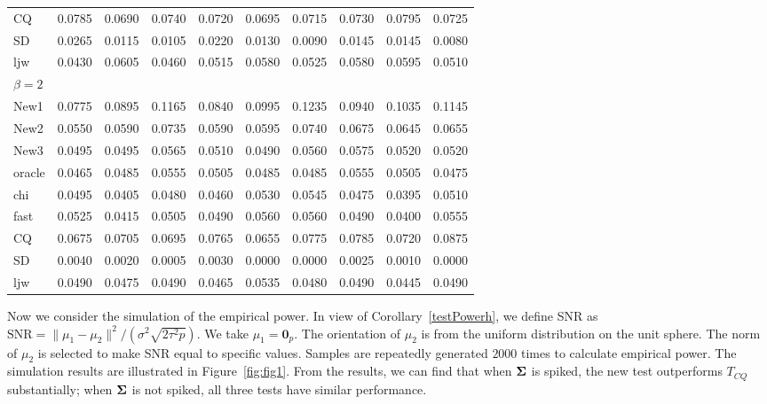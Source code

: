 \documentclass[review]{elsarticle}
\theoremstyle{plain}
\theoremstyle{definition}
\theoremstyle{remark}
\begin{document}
\begin{table}[ht]
\begin{tabular}{llllllllll}
CQ & 0.0785 & 0.0690 & 0.0740 & 0.0720 & 0.0695 & 0.0715 & 0.0730 & 0.0795 & 0.0725 \\ 
SD & 0.0265 & 0.0115 & 0.0105 & 0.0220 & 0.0130 & 0.0090 & 0.0145 & 0.0145 & 0.0080 \\ 
ljw & 0.0430 & 0.0605 & 0.0460 & 0.0515 & 0.0580 & 0.0525 & 0.0580 & 0.0595 & 0.0510 \\ 
    $\beta=2$\\
New1 & 0.0775 & 0.0895 & 0.1165 & 0.0840 & 0.0995 & 0.1235 & 0.0940 & 0.1035 & 0.1145 \\ 
New2 & 0.0550 & 0.0590 & 0.0735 & 0.0590 & 0.0595 & 0.0740 & 0.0675 & 0.0645 & 0.0655 \\ 
New3 & 0.0495 & 0.0495 & 0.0565 & 0.0510 & 0.0490 & 0.0560 & 0.0575 & 0.0520 & 0.0520 \\ 
oracle & 0.0465 & 0.0485 & 0.0555 & 0.0505 & 0.0485 & 0.0485 & 0.0555 & 0.0505 & 0.0475 \\ 
chi & 0.0495 & 0.0405 & 0.0480 & 0.0460 & 0.0530 & 0.0545 & 0.0475 & 0.0395 & 0.0510 \\ 
fast & 0.0525 & 0.0415 & 0.0505 & 0.0490 & 0.0560 & 0.0560 & 0.0490 & 0.0400 & 0.0555 \\ 
CQ & 0.0675 & 0.0705 & 0.0695 & 0.0765 & 0.0655 & 0.0775 & 0.0785 & 0.0720 & 0.0875 \\ 
SD & 0.0040 & 0.0020 & 0.0005 & 0.0030 & 0.0000 & 0.0000 & 0.0025 & 0.0010 & 0.0000 \\ 
ljw & 0.0490 & 0.0475 & 0.0490 & 0.0465 & 0.0535 & 0.0480 & 0.0490 & 0.0445 & 0.0490 \\ 
\bottomrule
\end{tabular}
\end{table}





Now we consider the simulation of the empirical power.
In view of Corollary~\ref{testPowerh}, we define SNR as $\textrm{SNR}=\|\mu_1-\mu_2\|^2/(\sigma^2\sqrt{2\tau^2 p})$.
We take $\mu_1=\mathbf{0}_p$.
The orientation of $\mu_2$ is from the uniform distribution on the unit sphere.
The norm of $\mu_2$ is selected to make SNR equal to specific values.
Samples are repeatedly generated $2000$ times to calculate empirical power.
The simulation results are illustrated in Figure~\ref{fig:fig1}.
From the results, we can find that when $\boldsymbol{\Sigma}$ is spiked, the new test outperforms $T_{CQ}$ substantially; when $\boldsymbol{\Sigma}$ is not spiked, all three tests have similar performance.
\end{document}
